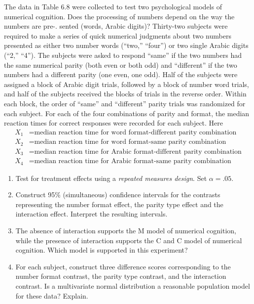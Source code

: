 The data in Table 6.8 were collected to test two psychological models of numerical cognition.
Does the processing of numbers depend on the way the numbers are pre-.
sented (words, Arabic digits)?
Thirty-two subjects were required to make a series of quick numerical judgments about two numbers presented as either two number
words (``two,'' ``four'') or two single Arabic digits (``2,'' ``4'').
The subjects were asked to respond ``same'' if the two numbers had the same numerical parity (both even or both odd) and ``different'' if the two numbers had a different parity (one even, one odd).
Half of the subjects were assigned a block of Arabic digit trials, followed by a block of number word trials, and half of the subjects received the blocks of trials in the reverse order.
Within each block, the order of ``same'' and ``different'' parity
trials was randomized for each subject.
For each of the four combinations of parity and format, the median reaction times for correct responses were recorded for each
subject.
Here
\begin{align*}
    X_{1} &= \text{median reaction time for word format-different parity combination} \\
    X_{2} &= \text{median reaction time for word format-same parity combination} \\
    X_{3} &= \text{median reaction time for Arabic format-different parity combination} \\
    X_{4} &= \text{median reaction time for Arabic format-same parity combination}
\end{align*}
\begin{enumerate}[label= (\alph*)]
    \item Test for treatment effects using a \textit{repeated measures design}. Set $\alpha = .05$.
    \item Construct 95\% (simultaneous) confidence intervals for the contrasts representing
    the number format effect, the parity type effect and the interaction effect. Interpret
    the resulting intervals.
    \item The absence of interaction supports the M model of numerical cognition, while the
    presence of interaction supports the C and C model of numerical cognition. Which
    model is supported in this experiment?
    \item For each subject, construct three difference scores corresponding to the number format
    contrast, the parity type contrast, and the interaction contrast. Is a multivariate
    normal distribution a reasonable population model for these data? Explain.
\end{enumerate}